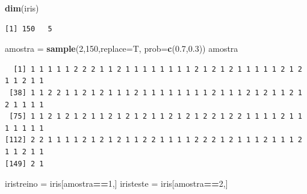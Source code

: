\documentclass[12pt,brazil,oneside]{book}
\newenvironment{Shaded}{\begin{snugshade}}{\end{snugshade}}
\newcommand{\DataTypeTok}[1]{\textcolor[rgb]{0.13,0.29,0.53}{#1}}
\newcommand{\DecValTok}[1]{\textcolor[rgb]{0.00,0.00,0.81}{#1}}
\newcommand{\FloatTok}[1]{\textcolor[rgb]{0.00,0.00,0.81}{#1}}
\newcommand{\KeywordTok}[1]{\textcolor[rgb]{0.13,0.29,0.53}{\textbf{#1}}}
\newcommand{\NormalTok}[1]{#1}
\newcommand{\OperatorTok}[1]{\textcolor[rgb]{0.81,0.36,0.00}{\textbf{#1}}}
\newcommand{\StringTok}[1]{\textcolor[rgb]{0.31,0.60,0.02}{#1}}
\begin{document}
\begin{Shaded}
\begin{Highlighting}[]
\KeywordTok{dim}\NormalTok{(iris)}
\end{Highlighting}
\end{Shaded}

\begin{verbatim}
[1] 150   5
\end{verbatim}

\begin{Shaded}
\begin{Highlighting}[]
\NormalTok{amostra =}\StringTok{ }\KeywordTok{sample}\NormalTok{(}\DecValTok{2}\NormalTok{,}\DecValTok{150}\NormalTok{,}\DataTypeTok{replace=}\NormalTok{T, }\DataTypeTok{prob=}\KeywordTok{c}\NormalTok{(}\FloatTok{0.7}\NormalTok{,}\FloatTok{0.3}\NormalTok{))}
\NormalTok{amostra}
\end{Highlighting}
\end{Shaded}

\begin{verbatim}
  [1] 1 1 1 1 1 2 2 2 1 1 2 1 1 1 1 1 1 1 1 2 1 2 1 2 1 1 1 1 1 2 1 2 1 1 2 1 1
 [38] 1 1 2 2 1 1 2 1 2 1 1 1 2 1 1 1 1 1 1 1 1 2 1 1 1 2 1 2 1 1 2 1 2 1 1 1 1
 [75] 1 1 2 1 2 1 2 1 1 2 1 2 1 2 1 1 2 1 2 1 2 2 1 2 2 1 1 1 1 2 1 1 1 1 1 1 1
[112] 2 2 1 1 1 1 2 1 2 1 2 1 1 2 2 1 1 1 1 2 2 2 1 2 1 1 1 2 1 1 1 2 1 1 2 1 1
[149] 2 1
\end{verbatim}

\begin{Shaded}
\begin{Highlighting}[]
\NormalTok{iristreino =}\StringTok{ }\NormalTok{iris[amostra}\OperatorTok{==}\DecValTok{1}\NormalTok{,]}
\NormalTok{iristeste =}\StringTok{ }\NormalTok{iris[amostra}\OperatorTok{==}\DecValTok{2}\NormalTok{,]}
\end{Highlighting}
\end{Shaded}

\begin{Shaded}
\end{Shaded}
\end{document}
